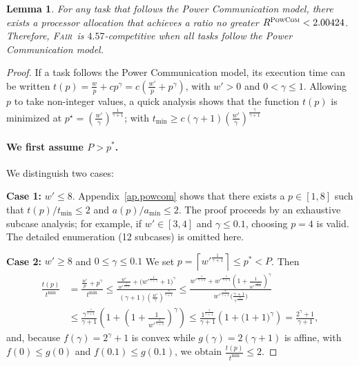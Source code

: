 \documentclass{article}
\newtheorem{lemma}{Lemma}
\newcommand\fair{\textsc{Fair}\xspace}
\newcommand\PCOM{\textsc{PowCom}\xspace}
\begin{document}
\begin{lemma}\label{lem.pcom}
For any task that follows the Power Communication model, there exists a processor allocation that achieves a ratio no greater $R^{\PCOM}<2.00424$. Therefore, \fair\ is $4.57$-competitive when all tasks follow the Power Communication model.
\end{lemma}
\begin{proof}
If a task follows the Power Communication model, its execution time can be written
$t(p) = \frac{w}{p} + c p^\gamma
       = c \left( \frac{w'}{p} + p^\gamma \right)$,
with $w'>0$ and $0<\gamma \le 1$. Allowing $p$ to take non-integer values, a quick analysis shows that
the function $t(p)$ is minimized at
$p^{\star} = \left( \frac{w'}{\gamma} \right)^{\frac{1}{\gamma+1}}$; with
 $t_{\min} \geq c\left( \gamma+1\right)\left( \frac{w'}{\gamma} \right)^{\frac{\gamma}{\gamma+1}}$

\paragraph{We first assume $P>p^*$.}
We distinguish two cases:

\textbf{Case 1:} $w' \le 8$.  
Appendix~\ref{ap.powcom} shows that there exists a $p\in[1,8]$ such that
$t(p)/t_{\min}\le 2$ and $a(p)/a_{\min}\le 2$.
The proof proceeds by an exhaustive subcase analysis; for example,
if $w' \in [3,4]$ and $\gamma\le 0.1$, choosing $p=4$ is valid.
The detailed enumeration (12 subcases) is omitted here.


\textbf{Case 2:} $w' \ge 8$ and $0\le\gamma\le 0.1$  
We set \(p=\left\lceil w'^{\frac{1}{\gamma+1}}\right\rceil \leq p^* <P\).  
Then  
\begin{align*}
\frac{t(p)}{t^{\min}} &= \frac{\frac{w'}{p}+p^\gamma}{t^{\min}} \le \frac{\frac{w'}{\,w'^{\frac{1}{\gamma+1}}} + \bigl(w'^{\frac{1}{\gamma+1}}+1\bigr)^\gamma}
        {(\gamma+1)\!\left(\frac{w'}{\gamma}\right)^{\frac{\gamma}{\gamma+1}}} \le \frac{w'^{\frac{\gamma}{\gamma+1}}
          + w'^{\frac{\gamma}{\gamma+1}}\!\left(1+\frac{1}{w'^{\frac{1}{\gamma+1}}}\right)^\gamma}
        {w'^{\frac{\gamma}{\gamma+1}}
          \bigl(\tfrac{\gamma+1}{\gamma^{\frac{\gamma}{\gamma+1}}}\bigr)} \\
&\le \frac{\gamma^{\frac{\gamma}{\gamma+1}}}{\gamma+1}
       \left(1+\left(1+\frac{1}{w'^{\frac{1}{\gamma+1}}}\right)^\gamma\right) \le \frac{1^{\frac{\gamma}{\gamma+1}}}{\gamma+1}
       \left(1+\bigl(1+1\bigr)^\gamma\right)
     = \frac{2^\gamma+1}{\gamma+1},
\end{align*}
and, because \(f(\gamma)=2^\gamma+1\) is convex while 
\(g(\gamma)=2(\gamma+1)\) is affine, with 
\(f(0)\le g(0)\) and \(f(0.1)\le g(0.1)\), we obtain
\(\frac{t(p)}{t^{\min}}\le 2.\)


\end{proof}
\end{document}
